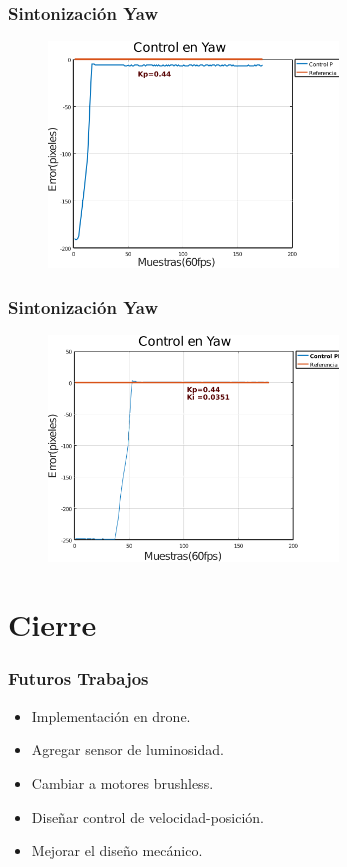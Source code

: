 \documentclass[11pt]{beamer}
\begin{document}
  \begin{frame}
    \frametitle{Sintonización Yaw}
    \begin{figure}
      \includegraphics[height=6cm, keepaspectratio]{images/Sintonizacion-Yaw.png}
    \end{figure}
  \end{frame}
  \begin{frame}
    \frametitle{Sintonización Yaw}
    \begin{figure}
      \includegraphics[height=6cm, keepaspectratio]{images/Sintonizacion-Yaw1.png}
    \end{figure}
  \end{frame}
 

  \section{Cierre}
  \begin{frame}
    \frametitle{Futuros Trabajos}
    \begin{itemize}
      \item Implementación en drone.
      \item Agregar sensor de luminosidad.
      \item Cambiar a motores brushless.
      \item Diseñar control de velocidad-posición.
      \item Mejorar el diseño mecánico.
    \end{itemize}
  \end{frame}
\end{document}
